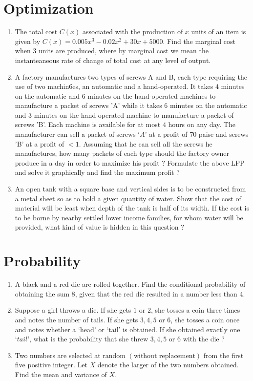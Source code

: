\documentclass{article}
\providecommand{\brak}[1]{\ensuremath{\left(#1\right)}}
\begin{document}
\section{Optimization}
\begin{enumerate}
\item The total cost $C\brak{x}$ associated with the production of $x$ units of an item is given by $C\brak{x} = 0.005x^{3} - 0.02x^{2} + 30x + 5000$. Find the marginal cost when 3 units are produced, where by marginal cost we mean the instanteaneous rate of change of total cost at any level of output.
\item A factory manufactures two types of screws A and B, each type requiring the use of two machin6es, an automatic and a hand-operated. It takes $4$ minutes on the automatic and $6$ minutes on the hand-operated machines to manufacture a packet of screws 'A' while it takes $6$ minutes on the automatic and $3$ minutes on the hand-operated machine to manufacture a packet of screws 'B'. Each machine is available for at most $4$ hours on any day. The manufacturer can sell a packet of screws $‘A’$ at a profit of $70$ paise and screws 'B' at a profit of $< 1$. Assuming that he can sell all the screws he manufactures, how many packets of each type should the factory owner produce in a day in order to maximize his profit ? Formulate the above LPP and solve it graphically and find the maximum profit ?
\item An open tank with a square base and vertical sides is to be constructed from a metal sheet so as to hold a given quantity of water. Show that the cost of material will be least when depth of the tank is half of its width. If the cost is to be borne by nearby settled lower income families, for whom water will be provided, what kind of value is hidden in this question ?  	
\end{enumerate}
\section{Probability}
\begin{enumerate}
\item A black and a red die are rolled together. Find the conditional probability of obtaining the sum $8$, given that the red die resulted in a number less than $4$.
\item Suppose a girl throws a die. If she gets $1$ or $2$, she tosses a coin three times and notes the number of tails. If she gets $3, 4, 5$ or $6$, she tosses a coin once and notes whether a ‘head’ or ‘tail’ is obtained. If she obtained exactly one $‘tail’$, what is the probability that she threw $3, 4, 5$ or $6$ with the die ?
\item Two numbers are selected at random \brak{\text{without replacement}} from the first five positive integer. Let $X$ denote the larger of the two numbers obtained. Find the mean and variance of $X$.
\end{enumerate}
\end{document}
